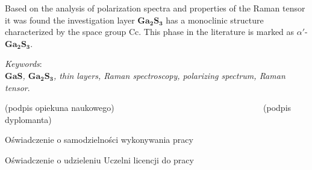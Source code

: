 Based on the analysis of polarization spectra and properties of the Raman tensor it was found the investigation layer $\mathbf{Ga_{2}S_{3}}$ has a monoclinic structure characterized by the space group Cc. This phase in the literature is marked as $\alpha'$-$\mathbf{Ga_{2}S_{3}}$.

\vspace{10mm}

\textit{Keywords}: \\
\textit{$\mathbf{GaS}$, $\mathbf{Ga_{2}S_{3}}$, thin layers, Raman spectroscopy, polarizing spectrum, Raman tensor}.

\vspace{30mm}

(podpis opiekuna naukowego) \textcolor{white}{---------------------------------------------------} (podpis dyplomanta)

\newpage

Oświadczenie o samodzielności wykonywania pracy

\newpage

Oświadczenie o udzieleniu Uczelni licencji do pracy

\newpage